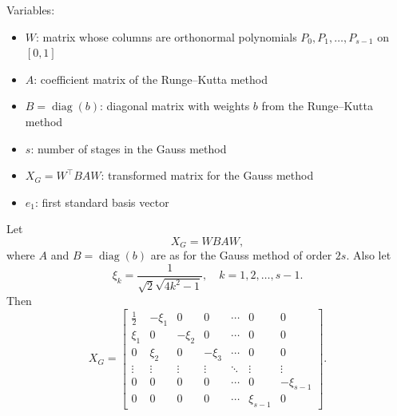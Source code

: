 Variables:
\begin{itemize}
    \item $W$: matrix whose columns are orthonormal polynomials $P_0,P_1,\dots,P_{s-1}$ on $[0,1]$
    \item $A$: coefficient matrix of the Runge--Kutta method
    \item $B = \operatorname{diag}(b)$: diagonal matrix with weights $b$ from the Runge--Kutta method
    \item $s$: number of stages in the Gauss method
    \item $X_G = W^\top B A W$: transformed matrix for the Gauss method
    \item $e_1$: first standard basis vector
\end{itemize}

\begin{lemma}

  \label{lem:359A}
Let
\[
X_G = W BAW,
\]
where $A$ and $B = \operatorname{diag}(b)$ are as for the Gauss method of order $2s$. Also let
\[
\xi_k = \frac{1}{\sqrt{2} \sqrt{4k^2 - 1}}, \quad k = 1, 2, \dots, s-1.
\]
Then
\[
X_G = \begin{bmatrix}
\frac{1}{2} & -\xi_1 & 0 & 0 & \cdots & 0 & 0 \\
\xi_1 & 0 & -\xi_2 & 0 & \cdots & 0 & 0 \\
0 & \xi_2 & 0 & -\xi_3 & \cdots & 0 & 0 \\
\vdots & \vdots & \vdots & \vdots & \ddots & \vdots & \vdots \\
0 & 0 & 0 & 0 & \cdots & 0 & -\xi_{s-1} \\
0 & 0 & 0 & 0 & \cdots & \xi_{s-1} & 0
\end{bmatrix}.
\]
\end{lemma}

